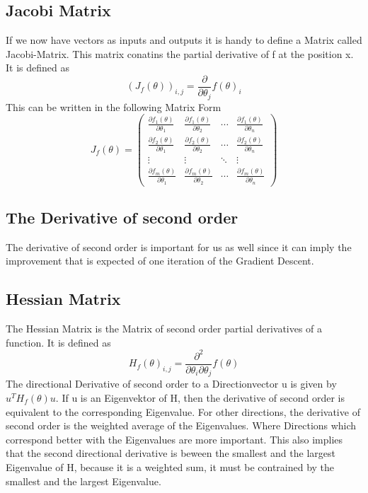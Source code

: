 \documentclass[a4paper]{article}
\begin{document}
\subsection{Jacobi Matrix}
If we now have vectors as inputs and outputs it is handy to define a Matrix called Jacobi-Matrix. This matrix conatins the partial derivative of f at the position x. It is defined as \[ (J_{f}(\theta))_{i,j} = \frac{\partial}{\partial \theta_{j}} f(\theta)_{i} \]
This can be written in the following Matrix Form \[ J_{f}(\theta) = \begin{pmatrix} \frac{\partial f_{1}(\theta)}{\partial \theta_{1}} & \frac{\partial f_{1}(\theta)}{\partial \theta_{2}} & \cdots & \frac{\partial f_{1}(\theta)}{\partial \theta_{n}} \\ \frac{\partial f_{2}(\theta)}{\partial \theta_{1}} & \frac{\partial f_{2}(\theta)}{\partial \theta_{2}} & \cdots & \frac{\partial f_{2}(\theta)}{\partial \theta_{n}} \\ \vdots & \vdots & \ddots & \vdots \\ \frac{\partial f_{m}(\theta)}{\partial \theta_{1}} & \frac{\partial f_{m}(\theta)}{\partial \theta_{2}} & \cdots & \frac{\partial f_{m}(\theta)}{\partial \theta_{n}} \end{pmatrix} \]

\subsection{The Derivative of second order}
The derivative of second order is important for us as well since it can imply the improvement that is expected of one iteration of the Gradient Descent. 

\subsection{Hessian Matrix}
The Hessian Matrix is the Matrix of second order partial derivatives of a function. It is defined as \[ H_{f}(\theta)_{i,j} = \frac{\partial^{2}}{\partial \theta_{i} \partial \theta_{j}} f(\theta) \] The directional Derivative of second order to a Directionvector u 
is given by $u^{T} H_{f}(\theta) u$. If u is an Eigenvektor of H, then the derivative of second order is equivalent to the corresponding Eigenvalue. For other directions, the derivative of second order is the weighted average of the Eigenvalues.
Where Directions which correspond better with the Eigenvalues are more important. This also implies that the second directional derivative is beween the smallest and the largest Eigenvalue of H, because it is a weighted sum, it must be contrained by the smallest and the largest Eigenvalue.
\end{document}
